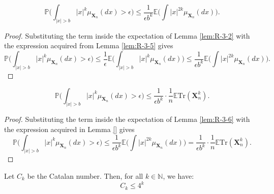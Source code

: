 \begin{lemma}[R-3-6 : lem:R-3-6]
  \notready
  \label{lem:R-3-6}
  \[
  \mathbb{P} \biggl( \int_{|x| > b} |x|^k \mu_{\mathbf{X}_n}(dx) > \epsilon \biggl) \leq \frac{1}{\epsilon b^k} \mathbb{E} \biggl( \int |x|^{2k} \mu_{\mathbf{X}_n}(dx) \biggl).
  \]
\end{lemma}
\begin{proof}
  Substituting the term inside the expectation of Lemma \ref{lem:R-3-2} with the expression acquired from Lemma \ref{lem:R-3-5} gives
  \[
  \mathbb{P} \biggl( \int_{|x| > b} |x|^k \mu_{\mathbf{X}_n}(dx) > \epsilon \biggl) \leq \frac{1}{\epsilon} \mathbb{E} \biggl( \int_{|x| > b} |x|^k \mu_{\mathbf{X}_n}(dx) \biggl) \leq \frac{1}{\epsilon b^k} \mathbb{E} \biggl( \int |x|^{2k} \mu_{\mathbf{X}_n}(dx) \biggl).
  \]
\end{proof}
\begin{lemma}[R-3-7 : lem:R-3-7]
  \notready
  \label{lem:R-3-7}
  \[
  \mathbb{P} \biggl( \int_{|x| > b} |x|^k \mu_{\mathbf{X}_n}(dx) > \epsilon \biggl) \leq \frac{1}{\epsilon b^k} \cdot \frac{1}{n} \mathbb{E} \mathrm{Tr} (\mathbf{X}_n^k).
  \]
\end{lemma}
\begin{proof}
  Substituting the term inside the expectation of Lemma \ref{lem:R-3-6} with the expression acquired in Lemma \ref{} gives
  \[
  \mathbb{P} \biggl( \int_{|x| > b} |x|^k \mu_{\mathbf{X}_n}(dx) > \epsilon \biggl) \leq \frac{1}{\epsilon b^k} \mathbb{E} \biggl( \int |x|^{2k} \mu_{\mathbf{X}_n}(dx) \biggl) = \frac{1}{\epsilon b^k} \cdot \frac{1}{n} \mathbb{E} \mathrm{Tr} (\mathbf{X}_n^k).
  \]
\end{proof}


\begin{lemma}
    \label{lem:Catalan_bound}
    \notready
    Let $C_{k}$ be the Catalan number. Then, for all $k \in \mathbb{N}$, we have:
    $$
    C_{k} \leq 4^{k}
    $$ 
\end{lemma}

